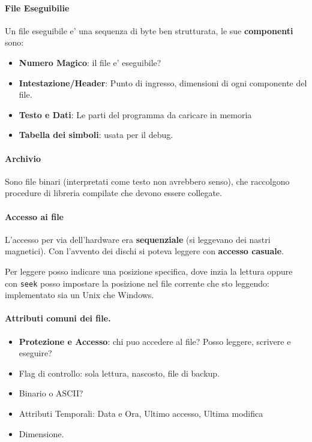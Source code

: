 \paragraph{File Eseguibilie}
Un file eseguibile e' una sequenza di byte ben strutturata, le sue \textbf{componenti} sono:
\begin{itemize}
    \item \textbf{Numero Magico}: il file e' eseguibile?
    \item \textbf{Intestazione/Header}: Punto di ingresso, dimensioni di ogni componente del file.
    \item \textbf{Testo e Dati}: Le parti del programma da caricare in memoria
    \item \textbf{Tabella dei simboli}: usata per il debug.
\end{itemize}

\paragraph{Archivio}
Sono file binari (interpretati come testo non avrebbero senso), che raccolgono procedure di libreria compilate
che devono essere collegate.

\paragraph{Accesso ai file}
L'accesso per via dell'hardware era \textbf{sequenziale} (si leggevano dei nastri magnetici).
Con l'avvento dei dischi si poteva leggere con \textbf{accesso casuale}.

Per leggere posso indicare una posizione specifica, dove inzia la lettura oppure con \texttt{seek}
posso impostare la posizione nel file corrente che sto leggendo: implementato sia un Unix che Windows.

\paragraph{Attributi comuni dei file.}
\begin{itemize}
    \item \textbf{Protezione e Accesso}: chi puo accedere al file? Posso leggere, scrivere e eseguire?
    \item Flag di controllo: sola lettura, nascosto, file di backup.
    \item Binario o ASCII?
    \item Attributi Temporali: Data e Ora, Ultimo accesso, Ultima modifica
    \item Dimensione.
\end{itemize}

